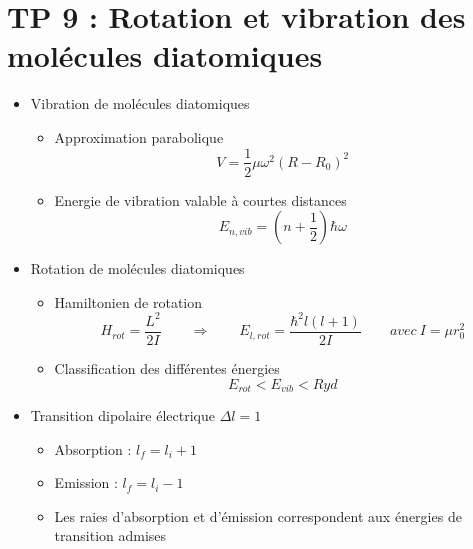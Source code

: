 
\section*{TP 9 : Rotation et vibration des molécules diatomiques}
\begin{itemize}
	
	\item Vibration de molécules diatomiques
		\begin{itemize}
			
			\item Approximation parabolique 
				\begin{equation}
				V = \frac{1}{2}\mu \omega ^2 (R-R_0)^2
				\end{equation}
					
			\item Energie de vibration valable à courtes distances 
				\begin{equation}
				E_{n,vib} = (n+\frac{1}{2})\hbar \omega
				\end{equation}
			\end{itemize}
		
		\item Rotation de molécules diatomiques
			
			\begin{itemize}
				\item Hamiltonien de rotation
					\begin{equation}
					H_{rot} = \frac{L^2}{2I} \qquad \Rightarrow \qquad E_{l,rot} = \frac{\hbar ^2 l(l+1)}{2I} \qquad avec \ I = \mu r_0 ^2
					\end{equation}
				
				\item Classification des différentes énergies
					\begin{equation}
					E_{rot} < E_{vib} < Ryd
					\end{equation}
			\end{itemize}
			
		\item Transition dipolaire électrique $\Delta l = 1$

			\begin{itemize}
				\item Absorption : $l_f = l_i + 1$
				\item Emission : $l_f = l_i - 1$
				\item Les raies d'absorption et d'émission correspondent aux énergies de transition admises
			\end{itemize}
\end{itemize}

